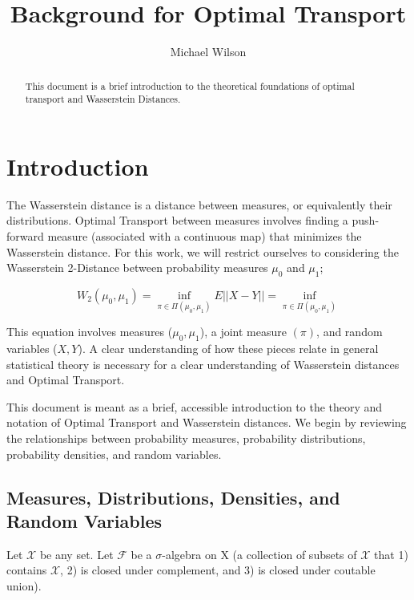 \documentclass[]{article}
\title{Background for Optimal Transport}
\author{Michael Wilson}
\date{}
\begin{document}
	
	\maketitle
	
	\begin{abstract}
		This document is a brief introduction to the theoretical foundations of optimal transport and Wasserstein Distances.
	\end{abstract}
	
	\section{Introduction}
	
	The Wasserstein distance is a distance between measures, or equivalently their distributions. Optimal Transport between measures involves finding a push-forward measure (associated with a continuous map) that minimizes the Wasserstein distance. For this work, we will restrict ourselves to considering the Wasserstein 2-Distance between probability measures $\mu_0$ and $\mu_1$;
	
	\begin{equation}
		W_2(\mu_0, \mu_1) = \inf_{\pi \in \Pi(\mu_0, \mu_1)} E||X - Y|| = \inf_{\pi \in \Pi(\mu_0, \mu_1)} 
	\end{equation}
	
	This equation involves measures ($\mu_0, \mu_1$), a joint measure $(\pi)$, and random variables ($X,Y$). A clear understanding of how these pieces relate in general statistical theory is necessary for a clear understanding of Wasserstein distances and Optimal Transport.   
	
	 This document is meant as a brief, accessible introduction to the theory and notation of Optimal Transport and Wasserstein distances. We begin by reviewing the relationships between probability measures, probability distributions, probability densities, and random variables.  
	
	\subsection{Measures, Distributions, Densities, and Random Variables}
	
	Let $\mathcal{X}$ be any set. Let $\mathcal{F}$ be a $\sigma$-algebra on X (a collection of subsets of $\mathcal{X}$ that 1) contains $\mathcal{X}$, 2) is closed under complement, and 3) is closed under coutable union). 
 	
	



	
\end{document}
